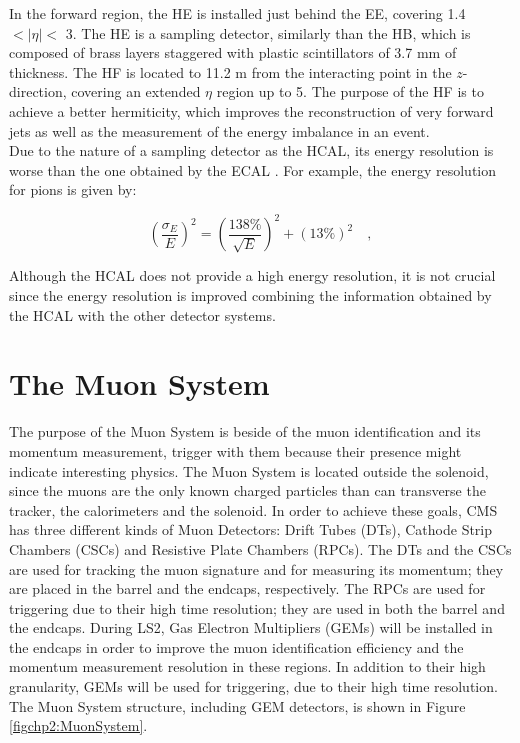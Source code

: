 In the forward region, the HE is installed just behind the EE, covering 
1.4 $ < |\eta| <$ 3. The HE is a sampling detector, similarly than the HB, which 
is composed of brass layers staggered with plastic scintillators of 3.7 mm of 
thickness. The HF is located to 11.2 m from the interacting point in the $z$-direction,
covering an extended $\eta$ region up to 5. The purpose of 
the HF is to achieve a better hermiticity, which improves 
the reconstruction of very forward jets as well as 
the measurement of the energy imbalance in an event. \\

Due to the nature of a sampling detector as the HCAL, its energy resolution 
is worse than the one obtained by the ECAL \cite{chp2:CMS}. For example, the energy
resolution for pions is given by:

\begin{equation} \label{ECALenergyResolution}
 \left(\frac{\sigma_{E}}{E}\right)^{2} = \left(\frac{138\%}{\sqrt{E}}\right)^{2} + \left(13\% \right)^{2}\quad, 
\end{equation}

Although the HCAL does not provide a high energy resolution, it is not crucial
since the energy resolution is improved combining the information obtained by the HCAL
with the other detector systems. 

\section{The Muon System}
\label{sec:MuonSys}

The purpose of the Muon System is beside of the muon 
identification and its momentum measurement, trigger with them because
their presence might indicate interesting physics. The Muon System
is located outside the solenoid, since the muons are the only known charged particles 
than can transverse the tracker, the calorimeters and the solenoid. In order to achieve these
goals, CMS has three different kinds of Muon Detectors: Drift Tubes (DTs), Cathode Strip 
Chambers (CSCs) and Resistive Plate Chambers (RPCs). The DTs and the CSCs are used for 
tracking the muon signature and for measuring its momentum; they are placed in the barrel
and the endcaps, respectively. The RPCs are used for triggering due to their high time 
resolution; they are used in both the barrel and the endcaps. During LS2, Gas 
Electron Multipliers (GEMs) will be installed in the endcaps in order to improve the muon identification efficiency and
the momentum measurement resolution in these regions. In addition to their high granularity, GEMs will be used for triggering,
due to their high time resolution. The Muon System structure, including GEM detectors, is 
shown in Figure \ref{figchp2:MuonSystem}.\\

